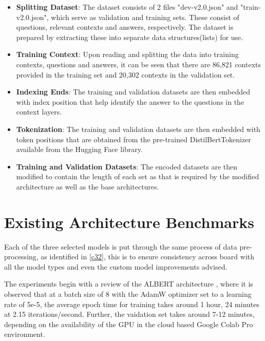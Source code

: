 \documentclass[a4paper,12pt]{report}
\begin{document}
        \begin{itemize}
        	\item \textbf{Splitting Dataset}: The dataset consists of 2 files "dev-v2.0.json" and "train-v2.0.json", which serve as validation and training sets. These consist of questions, relevant contexts and answers, respectively. The dataset is prepared by extracting these into separate data structures(lists) for use. 
        	\item \textbf{Training Context}: Upon reading and splitting the data into training contexts, questions and answers, it can be seen that there are 86,821 contexts provided in the training set and 20,302 contexts in the validation set. 
        	\item \textbf{Indexing Ends}: The training and validation datasets are then embedded with index position that help identify the answer to the questions in the context layers.
        	\item \textbf{Tokenization}: The training and validation datasets are then embedded with token positions that are obtained from the pre-trained DistilBertTokenizer available from the Hugging Face library.
        	\item \textbf{Training and Validation Datasets}: The encoded datasets are then modified to contain the length of each set as that is required by the modified architecture as well as the base architectures.         
        \end{itemize}
        	     
        
     \section{Existing Architecture Benchmarks}\label{c51}
     
     	Each of the three selected models is put through the same process of data pre-processing, as identified in \ref{c32}, this is to ensure consistency across board with all the model types and even the custom model improvements advised.
    	
    	The experiments begin with a review of the ALBERT architecture \citep{albert}, where it is observed that at a batch size of 8 with the AdamW optimizer set to a learning rate of 5e-5, the average epoch time for training takes around 1 hour, 24 minutes at 2.15 iterations/second. Further, the vaidation set takes around 7-12 minutes, depending on the availability of the GPU in the cloud based Google Colab Pro environment. 
    	
\end{document}
